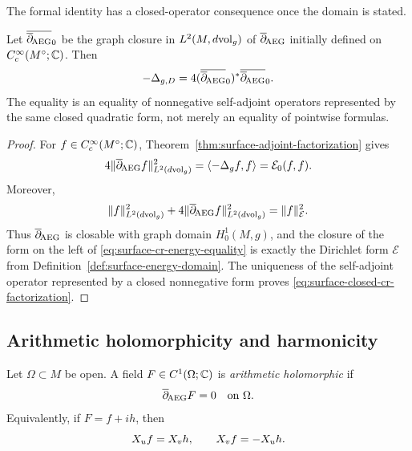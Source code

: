 The formal identity has a closed-operator consequence once the domain is stated.

\begin{corollary}
\label{cor:surface-dirichlet-cr-realization}
Let $\overline{\overline\partial_{\!\mathrm{AEG}}}_0$ be the graph closure in
$L^2(M,d\mathrm{vol}_g)$ of $\overline\partial_{\!\mathrm{AEG}}$ initially defined on
$C_c^\infty(M^\circ;\mathbb{C})$.  Then
\begin{equation}\label{eq:surface-closed-cr-factorization}
 -\Delta_{g,D}
 =4(\overline{\overline\partial_{\!\mathrm{AEG}}}_0)^*\overline{\overline\partial_{\!\mathrm{AEG}}}_0.
\end{equation}
The equality is an equality of nonnegative self-adjoint operators represented by
the same closed quadratic form, not merely an equality of pointwise formulas.
\end{corollary}

\begin{proof}
For $f\in C_c^\infty(M^\circ;\mathbb{C})$,
Theorem~\ref{thm:surface-adjoint-factorization} gives
\begin{equation}\label{eq:surface-cr-energy-equality}
 4\|\overline\partial_{\!\mathrm{AEG}} f\|_{L^2(d\mathrm{vol}_g)}^2
 =\langle-\Delta_gf,f\rangle
 =\mathcal E_0(f,f).
\end{equation}
Moreover,
\[
 \|f\|_{L^2(d\mathrm{vol}_g)}^2+4\|\overline\partial_{\!\mathrm{AEG}} f\|_{L^2(d\mathrm{vol}_g)}^2
 =\|f\|_{\mathcal E}^2.
\]
Thus $\overline\partial_{\!\mathrm{AEG}}$ is closable with graph domain $H_0^1(M,g)$, and the closure
of the form on the left of
\eqref{eq:surface-cr-energy-equality} is exactly the Dirichlet form
$\mathcal E$ from Definition~\ref{def:surface-energy-domain}.  The uniqueness
of the self-adjoint operator represented by a closed nonnegative form proves
\eqref{eq:surface-closed-cr-factorization}.
\end{proof}

\subsection{Arithmetic holomorphicity and harmonicity}

\begin{definition}
\label{def:surface-arithmetic-holomorphic}
Let $\Omega\subset M$ be open.  A field $F\in C^1(\Omega;\mathbb{C})$ is
\emph{arithmetic holomorphic} if
\begin{equation}\label{eq:surface-arithmetic-holomorphic-equation}
 \overline\partial_{\!\mathrm{AEG}} F=0
 \quad\text{on }\Omega.
\end{equation}
Equivalently, if $F=f+ih$, then
\begin{equation}\label{eq:surface-arithmetic-cr-real-system}
 X_u f=X_v h,
 \qquad
 X_v f=-X_u h.
\end{equation}
\end{definition}

